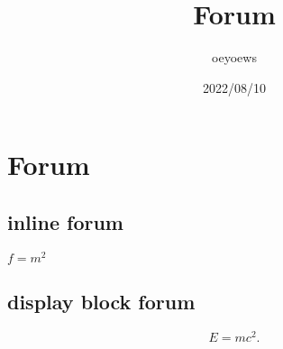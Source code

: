 \documentclass{article}
\title{Forum}
\author{oeyoews}
\date{2022/08/10}
\begin{document}
\maketitle

\section{Forum}%
\label{sec:Forum}

\subsection{inline forum}%
\label{sub:inline forum}

$f = m^2$

\subsection{display block forum}%
\label{sub:display block forum}

\[
E = mc^2
.\]
\end{document}
